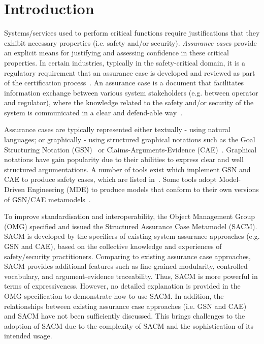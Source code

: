 \section{Introduction}
Systems/services used to perform critical functions require justifications that they exhibit necessary properties (i.e. safety and/or security). 
\textit{Assurance case}s provide an explicit means for justifying and assessing confidence in these critical properties. 
In certain industries, typically in the safety-critical domain, it is a regulatory requirement that an assurance case is developed and reviewed as part of the certification process~\cite{healthFound}.
An assurance case is a document that facilitates information exchange between various system stakeholders (e.g. between operator and regulator), where the knowledge related to the safety and/or security of the system is communicated in a clear and defend-able way~\cite{hawkins2013assurance}. 

Assurance cases are typically represented either textually - using natural languages; or graphically - using structured graphical notations such as the Goal Structuring Notation (GSN)~\cite{kelly2004goal} or Claims-Arguments-Evidence (CAE)~\cite{bishop2000methodology}. 
Graphical notations have gain popularity due to their abilities to express clear and well structured argumentations.
A number of tools exist which implement GSN and CAE to produce safety cases, which are listed in~\cite{maksimov2018}. 
Some tools adopt Model-Driven Engineering (MDE) to produce models that conform to their own versions of GSN/CAE metamodels~\cite{denney2017tool, matsuno2010dependability, netkachova2014tool, larrucea2017supporting, barry2011certware}.

To improve standardisation and interoperability, the Object Management Group (OMG) specified and issued the Structured Assurance Case Metamodel (SACM). 
SACM is developed by the specifiers of existing system assurance approaches (e.g. GSN and CAE), based on the collective knowledge and experiences of safety/security practitioners.
Comparing to existing assurance case approaches, SACM provides additional features such as fine-grained modularity, controlled vocabulary, and argument-evidence traceability. 
Thus, SACM is more powerful in terms of expressiveness. 
However, no detailed explanation is provided in the OMG specification to demonstrate how to use SACM. In addition, the relationships between existing assurance case approaches (i.e. GSN and CAE) and SACM have not been sufficiently discussed. 
This brings challenges to the adoption of SACM due to the complexity of SACM and the sophistication of its intended usage. 

